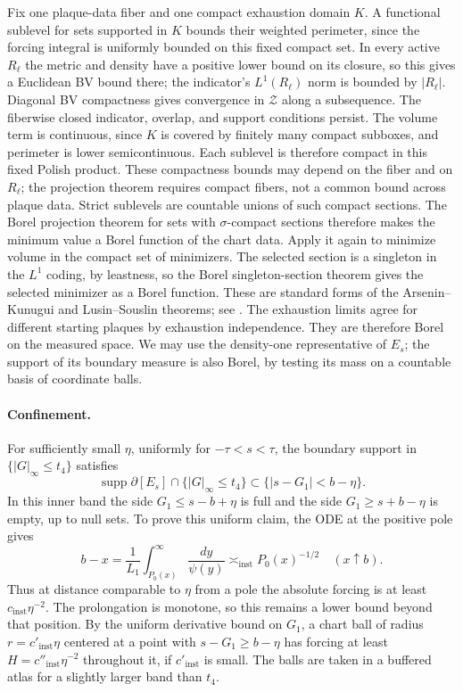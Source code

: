 Fix one plaque-data fiber and one compact exhaustion domain $K$.  A
functional sublevel for sets supported in $K$ bounds their weighted
perimeter, since the forcing integral is uniformly bounded on this
fixed compact set.  In every active $R_\ell$ the metric and density
have a positive lower bound on its closure, so this gives a Euclidean BV
bound there; the indicator's $L^1(R_\ell)$ norm is bounded by $|R_\ell|$.
Diagonal BV compactness gives convergence in $\mathcal Z$ along a
subsequence.  The fiberwise closed indicator, overlap, and support
conditions persist.  The volume term is continuous, since $K$ is
covered by finitely many compact subboxes, and perimeter is lower
semicontinuous.  Each sublevel is therefore compact in this fixed Polish
product.  These compactness bounds may depend on the fiber and on
$R_\ell$; the projection theorem requires compact fibers, not a common
bound across plaque data.  Strict sublevels are countable unions of such
compact sections.  The Borel projection theorem for sets with
$\sigma$-compact sections therefore makes the minimum value a Borel
function of the chart data.  Apply it again to minimize volume in the
compact set of minimizers.  The selected section is a singleton in the
$L^1$ coding, by leastness, so the Borel singleton-section theorem gives
the selected minimizer as a Borel function.  These are standard forms of
the Arsenin--Kunugui and Lusin--Souslin theorems; see
\cite[Theorem~18.18 and Corollary~15.2]{Kechris1995}.  The exhaustion limits agree
for different starting plaques by exhaustion independence.  They are therefore Borel
on the measured space.  We may use the density-one representative of
$E_s$; the support of its boundary measure is also Borel, by testing its
mass on a countable basis of coordinate balls.

\paragraph{Confinement.}
For sufficiently small $\eta$, uniformly for $-\tau<s<\tau$, the boundary
support in $\{|G|_\infty\le t_4\}$ satisfies
\begin{equation}\label{eq:degree-confinement}
\operatorname{supp}\partial[E_s]\cap\{|G|_\infty\le t_4\}
                         \subset\{|s-G_1|<b-\eta\}.
\end{equation}
In this inner band the side $G_1\le s-b+\eta$ is full and the side
$G_1\ge s+b-\eta$ is empty, up to null sets.  To prove this uniform claim,
the ODE at the positive pole gives
\[
 b-x=\frac1{L_1}\int_{P_0(x)}^\infty\frac{dy}{\psi(y)}
                  \asymp_{\mathrm{inst}}P_0(x)^{-1/2}
                  \quad(x\uparrow b).
\]
Thus at distance comparable to $\eta$ from a pole the absolute forcing is
at least $c_{\mathrm{inst}}\eta^{-2}$.  The prolongation is monotone, so
this remains a lower bound beyond that position.  By the uniform
derivative bound on $G_1$, a chart ball of radius
$r=c'_{\mathrm{inst}}\eta$ centered at a point with $s-G_1\ge b-\eta$
has forcing at least $H=c''_{\mathrm{inst}}\eta^{-2}$ throughout it, if
$c'_{\mathrm{inst}}$ is small.  The balls are taken in a buffered atlas
for a slightly larger band than $t_4$.

